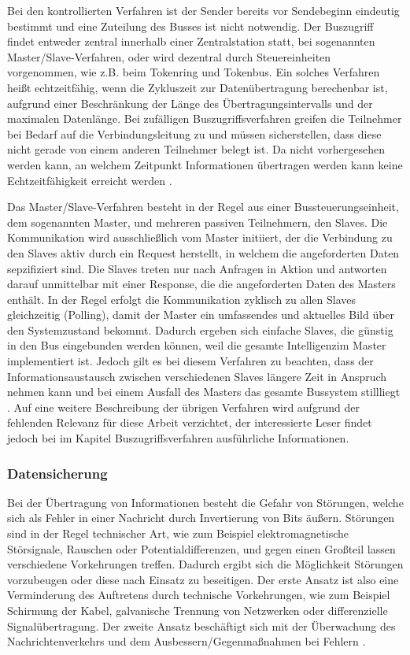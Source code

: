 Bei den kontrollierten Verfahren ist der Sender bereits vor Sendebeginn eindeutig bestimmt und eine Zuteilung des Busses ist nicht notwendig. Der Buszugriff findet entweder zentral innerhalb einer Zentralstation statt, bei sogenannten Master/Slave-Verfahren, oder wird dezentral durch Steuereinheiten vorgenommen, wie z.B. beim Tokenring und Tokenbus. Ein solches Verfahren heißt echtzeitfähig, wenn die Zykluszeit zur Datenübertragung berechenbar ist, aufgrund einer Beschränkung der Länge des Übertragungsintervalls und der maximalen Datenlänge.
Bei zufälligen Buszugriffsverfahren greifen die Teilnehmer bei Bedarf auf die Verbindungsleitung zu und müssen sicherstellen, dass diese nicht gerade von einem anderen Teilnehmer belegt ist. Da nicht vorhergesehen werden kann, an welchem Zeitpunkt Informationen übertragen werden kann keine Echtzeitfähigkeit erreicht werden \cite[S.~19]{schn06}.

Das Master/Slave-Verfahren besteht in der Regel aus einer Bussteuerungseinheit, dem sogenannten Master, und mehreren passiven Teilnehmern, den Slaves. Die Kommunikation wird ausschließlich vom Master initiiert, der die Verbindung zu den Slaves aktiv durch ein Request herstellt, in welchem die angeforderten Daten sepzifiziert sind. Die Slaves treten nur nach Anfragen in Aktion und antworten darauf unmittelbar mit einer Response, die die angeforderten Daten des Masters enthält. In der Regel erfolgt die Kommunikation zyklisch zu allen Slaves gleichzeitig (Polling), damit der Master ein umfassendes und aktuelles Bild über den Systemzustand bekommt. Dadurch ergeben sich einfache Slaves, die günstig in den Bus eingebunden werden können, weil die gesamte \Gun Intelligenz\Gob im Master implementiert ist. Jedoch gilt es bei diesem Verfahren zu beachten, dass der Informationsaustausch zwischen verschiedenen Slaves längere Zeit in Anspruch nehmen kann und bei einem Ausfall des Masters das gesamte Bussystem stillliegt \cite[S.~19ff.]{schn06}.
Auf eine weitere Beschreibung der übrigen Verfahren wird aufgrund der fehlenden Relevanz für diese Arbeit verzichtet, der interessierte Leser findet jedoch bei \cite{schn06} im Kapitel Buszugriffsverfahren ausführliche Informationen.

\subsubsection{Datensicherung}

Bei der Übertragung von Informationen besteht die Gefahr von Störungen, welche sich als Fehler in einer Nachricht durch Invertierung von Bits  äußern. Störungen sind in der Regel technischer Art, wie zum Beispiel elektromagnetische Störsignale, Rauschen oder Potentialdifferenzen, und gegen einen Großteil lassen verschiedene Vorkehrungen treffen. Dadurch ergibt sich die Möglichkeit Störungen vorzubeugen oder diese nach Einsatz zu beseitigen. Der erste Ansatz ist also eine Verminderung des Auftretens durch technische Vorkehrungen, wie zum Beispiel Schirmung der Kabel, galvanische Trennung von Netzwerken oder differenzielle Signalübertragung. Der zweite Ansatz beschäftigt sich mit der Überwachung des Nachrichtenverkehrs und dem Ausbessern/Gegenmaßnahmen bei Fehlern \cite[S.~30]{schn06}.

